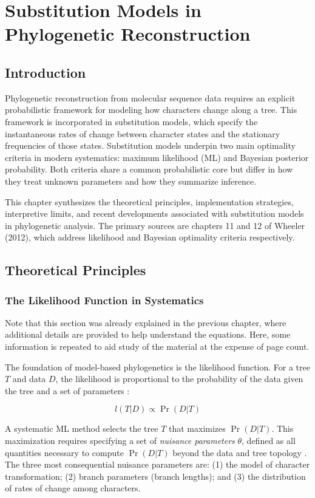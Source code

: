 \chapter{Substitution Models in Phylogenetic Reconstruction}

\section{Introduction}

Phylogenetic reconstruction from molecular sequence data requires an explicit probabilistic framework for modeling how characters change along a tree. This framework is incorporated in substitution models, which specify the instantaneous rates of change between character states and the stationary frequencies of those states. Substitution models underpin two main optimality criteria in modern systematics: maximum likelihood (ML) and Bayesian posterior probability. Both criteria share a common probabilistic core but differ in how they treat unknown parameters and how they summarize inference.

This chapter synthesizes the theoretical principles, implementation strategies, interpretive limits, and recent developments associated with substitution models in phylogenetic analysis. The primary sources are chapters 11 and 12 of Wheeler (2012), which address likelihood and Bayesian optimality criteria respectively.

\section{Theoretical Principles}

\subsection{The Likelihood Function in Systematics}

Note that this section was already explained in the previous chapter, where additional details are provided to help understand the equations. Here, some information is repeated to aid study of the material at the expense of page count.

The foundation of model-based phylogenetics is the likelihood function. For a tree $T$ and data $D$, the likelihood is proportional to the probability of the data given the tree and a set of parameters \parencite{edwards1972}:

$$l(T|D) \propto \Pr(D|T)$$

A systematic ML method selects the tree $T$ that maximizes $\Pr(D|T)$. This maximization requires specifying a set of \textit{nuisance parameters} $\theta$, defined as all quantities necessary to compute $\Pr(D|T)$ beyond the data and tree topology \parencite{wheeler2012}. The three most consequential nuisance parameters are: (1) the model of character transformation; (2) branch parameters (branch lengths); and (3) the distribution of rates of change among characters.

